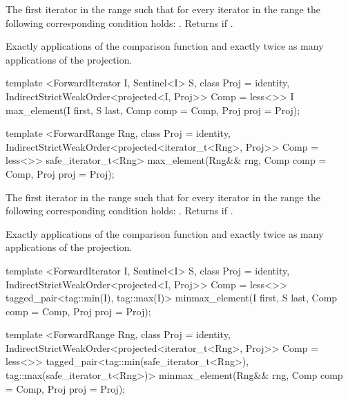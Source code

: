 \begin{itemdescr}
\pnum
\returns
The first iterator
in the range
such that for every iterator
in the range
the following corresponding condition holds:
.
Returns
if
.

\pnum
\complexity
Exactly
applications of the comparison function and
exactly twice as many applications of the projection.
\end{itemdescr}

%
\begin{itemdecl}
template <ForwardIterator I, Sentinel<I> S, class Proj = identity,
    IndirectStrictWeakOrder<projected<I, Proj>> Comp = less<>>
  I max_element(I first, S last, Comp comp = Comp{}, Proj proj = Proj{});

template <ForwardRange Rng, class Proj = identity,
    IndirectStrictWeakOrder<projected<iterator_t<Rng>, Proj>> Comp = less<>>
  safe_iterator_t<Rng>
    max_element(Rng&& rng, Comp comp = Comp{}, Proj proj = Proj{});
\end{itemdecl}

\begin{itemdescr}
\pnum
\returns
The first iterator
in the range
such that for every iterator
in the range
the following corresponding condition holds:
.
Returns
if
.

\pnum
\complexity
Exactly
applications of the comparison function and
exactly twice as many applications of the projection.
\end{itemdescr}

%
\begin{itemdecl}
template <ForwardIterator I, Sentinel<I> S, class Proj = identity,
    IndirectStrictWeakOrder<projected<I, Proj>> Comp = less<>>
  tagged_pair<tag::min(I), tag::max(I)>
    minmax_element(I first, S last, Comp comp = Comp{}, Proj proj = Proj{});

template <ForwardRange Rng, class Proj = identity,
    IndirectStrictWeakOrder<projected<iterator_t<Rng>, Proj>> Comp = less<>>
  tagged_pair<tag::min(safe_iterator_t<Rng>),
              tag::max(safe_iterator_t<Rng>)>
    minmax_element(Rng&& rng, Comp comp = Comp{}, Proj proj = Proj{});
\end{itemdecl}

